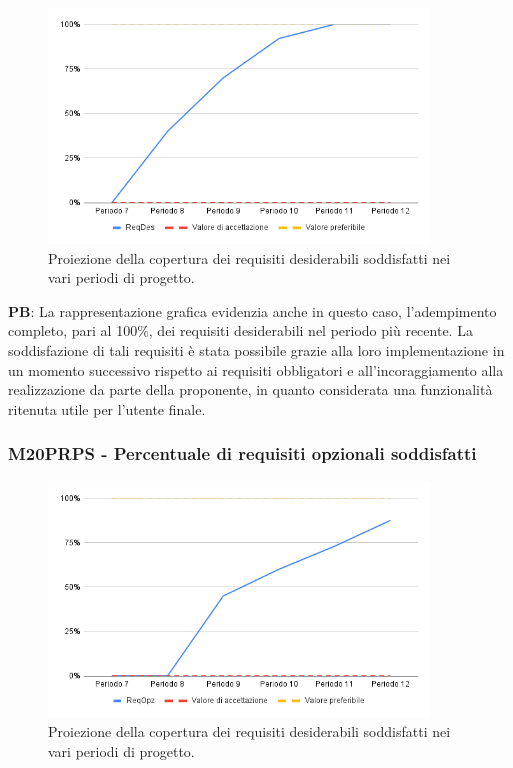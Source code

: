 \begin{figure}[H]
    \centering
    \includegraphics[width=0.9\textwidth]{../Images/PianoDiQualifica/PRDS.png}
    \caption{Proiezione della copertura dei requisiti desiderabili soddisfatti nei vari periodi di progetto.}
    \label{fig:11}
\end{figure}

\vspace{0.2cm}

\textbf{PB}: La rappresentazione grafica evidenzia anche in questo caso, l'adempimento completo, pari al 100\%, dei requisiti desiderabili nel periodo più recente. La soddisfazione di tali requisiti è stata possibile grazie alla loro implementazione in un momento successivo rispetto ai requisiti obbligatori e all’incoraggiamento alla realizzazione da parte della proponente, in quanto considerata una funzionalità ritenuta utile per l’utente finale.

\subsubsection{M20PRPS - Percentuale di requisiti opzionali soddisfatti}

\vspace{0.3cm}
\begin{figure}[H]
    \centering
    \includegraphics[width=0.9\textwidth]{../Images/PianoDiQualifica/PRPS.png}
    \caption{Proiezione della copertura dei requisiti desiderabili soddisfatti nei vari periodi di progetto.}
    \label{fig:12}
\end{figure}

